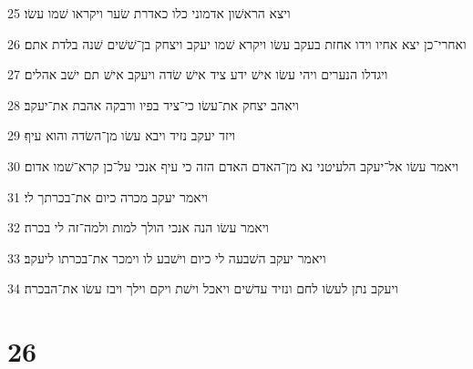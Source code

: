 \par 25 ויצא הראשׁון אדמוני כלו כאדרת שׂער ויקראו שׁמו עשׂו׃
\par 26 ואחרי־כן יצא אחיו וידו אחזת בעקב עשׂו ויקרא שׁמו יעקב ויצחק בן־שׁשׁים שׁנה בלדת אתם׃
\par 27 ויגדלו הנערים ויהי עשׂו אישׁ ידע ציד אישׁ שׂדה ויעקב אישׁ תם ישׁב אהלים׃
\par 28 ויאהב יצחק את־עשׂו כי־ציד בפיו ורבקה אהבת את־יעקב׃
\par 29 ויזד יעקב נזיד ויבא עשׂו מן־השׂדה והוא עיף׃
\par 30 ויאמר עשׂו אל־יעקב הלעיטני נא מן־האדם האדם הזה כי עיף אנכי על־כן קרא־שׁמו אדום׃
\par 31 ויאמר יעקב מכרה כיום את־בכרתך לי׃
\par 32 ויאמר עשׂו הנה אנכי הולך למות ולמה־זה לי בכרה׃
\par 33 ויאמר יעקב השׁבעה לי כיום וישׁבע לו וימכר את־בכרתו ליעקב׃
\par 34 ויעקב נתן לעשׂו לחם ונזיד עדשׁים ויאכל וישׁת ויקם וילך ויבז עשׂו את־הבכרה׃

\chapter{26}

